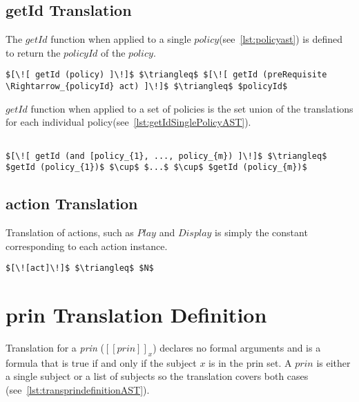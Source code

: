 \subsection{getId Translation}\label{sec:getIdtranslation}

The $getId$ function when applied to a single $policy$(see~\ref{lst:policyast}) is defined to return the $policyId$ of the $policy$.

\lstset{mathescape, language=AST}  
\begin{lstlisting}[frame=single, caption={getId for a Single policy},label={lst:getIdSinglePolicyAST}]
$[\![ getId (policy) ]\!]$ $\triangleq$ $[\![ getId (preRequisite \Rightarrow_{policyId} act) ]\!]$ $\triangleq$ $policyId$
\end{lstlisting}

$getId$ function when applied to a set of policies is the set union of the translations for each individual policy(see~\ref{lst:getIdSinglePolicyAST}).

\lstset{mathescape, language=AST}  
\begin{lstlisting}[frame=single, caption={getId for Policies Definition},label={lst:getIdAndPolicyAST}]

$[\![ getId (and [policy_{1}, ..., policy_{m}) ]\!]$ $\triangleq$ $getId (policy_{1})$ $\cup$ $...$ $\cup$ $getId (policy_{m})$
\end{lstlisting}

\subsection{action Translation}\label{sec:acttranslation}

Translation of actions, such as $Play$ and $Display$ is simply the constant corresponding to each action instance.

\lstset{mathescape, language=AST}  
\begin{lstlisting}[frame=single, caption={act Translation Definition},label={lst:actiontranslationAST}]
$[\![act]\!]$ $\triangleq$ $N$
\end{lstlisting}


\section{prin Translation Definition}
Translation for a \emph{prin} ($[\![ prin ]\!]_{x}$) declares no formal arguments and is a formula that is true if and only if the subject $x$ is in the prin set. A $prin$ is either a single subject or a list of subjects so the translation covers both cases (see~\ref{lst:transprindefinitionAST}).

